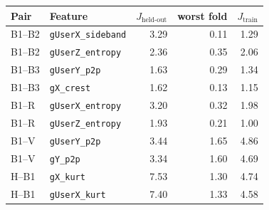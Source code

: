 \begin{tabular}{llrrr}
\toprule
Pair & Feature & $J_\text{held-out}$ & worst fold & $J_\text{train}$ \\
\midrule
B1--B2 & \texttt{gUserX\_sideband} & 3.29 & 0.11 & 1.29 \\
B1--B2 & \texttt{gUserZ\_entropy} & 2.36 & 0.35 & 2.06 \\
B1--B3 & \texttt{gUserY\_p2p} & 1.63 & 0.29 & 1.34 \\
B1--B3 & \texttt{gX\_crest} & 1.62 & 0.13 & 1.15 \\
B1--R & \texttt{gUserX\_entropy} & 3.20 & 0.32 & 1.98 \\
B1--R & \texttt{gUserZ\_entropy} & 1.93 & 0.21 & 1.00 \\
B1--V & \texttt{gUserY\_p2p} & 3.44 & 1.65 & 4.86 \\
B1--V & \texttt{gY\_p2p} & 3.34 & 1.60 & 4.69 \\
H--B1 & \texttt{gX\_kurt} & 7.53 & 1.30 & 4.74 \\
H--B1 & \texttt{gUserX\_kurt} & 7.40 & 1.33 & 4.58 \\
\bottomrule
\end{tabular}
